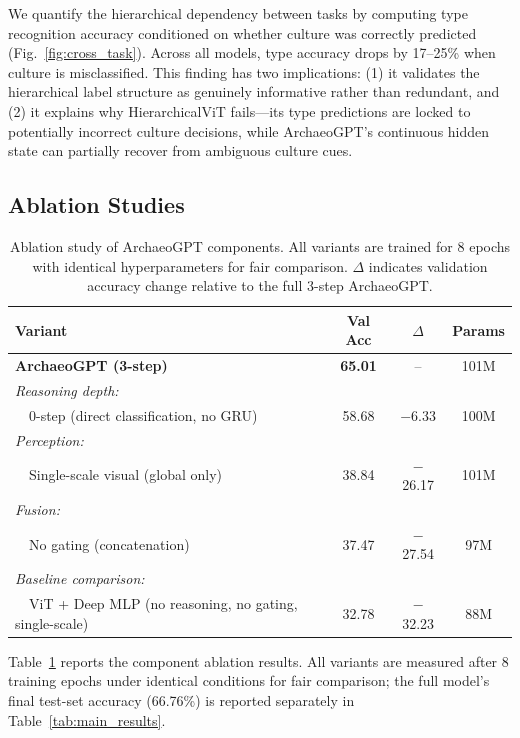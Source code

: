 \documentclass[10pt,twocolumn,letterpaper]{article}
\begin{document}
We quantify the hierarchical dependency between tasks by computing type recognition accuracy conditioned on whether culture was correctly predicted (Fig.~\ref{fig:cross_task}). Across all models, type accuracy drops by 17--25\% when culture is misclassified. This finding has two implications: (1) it validates the hierarchical label structure as genuinely informative rather than redundant, and (2) it explains why HierarchicalViT fails---its type predictions are locked to potentially incorrect culture decisions, while ArchaeoGPT's continuous hidden state can partially recover from ambiguous culture cues.

\subsection{Ablation Studies}
\label{sec:ablations}

\begin{table}[t]
\centering
\caption{Ablation study of ArchaeoGPT components. All variants are trained for 8 epochs with identical hyperparameters for fair comparison. $\Delta$ indicates validation accuracy change relative to the full 3-step ArchaeoGPT.}
\label{tab:ablation}
\small
\begin{tabular}{lccc}
\toprule
Variant & Val Acc & $\Delta$ & Params \\
\midrule
\textbf{ArchaeoGPT (3-step)} & \textbf{65.01} & -- & 101M \\
\addlinespace
\textit{Reasoning depth:} \\
~~0-step (direct classification, no GRU) & 58.68 & $-$6.33 & 100M \\
\addlinespace
\textit{Perception:} \\
~~Single-scale visual (global only) & 38.84 & $-$26.17 & 101M \\
\addlinespace
\textit{Fusion:} \\
~~No gating (concatenation) & 37.47 & $-$27.54 & 97M \\
\addlinespace
\textit{Baseline comparison:} \\
~~ViT + Deep MLP (no reasoning, no gating, single-scale) & 32.78 & $-$32.23 & 88M \\
\bottomrule
\end{tabular}
\end{table}

Table~\ref{tab:ablation} reports the component ablation results. All variants are measured after 8 training epochs under identical conditions for fair comparison; the full model's final test-set accuracy (66.76\%) is reported separately in Table~\ref{tab:main_results}.
\end{document}

